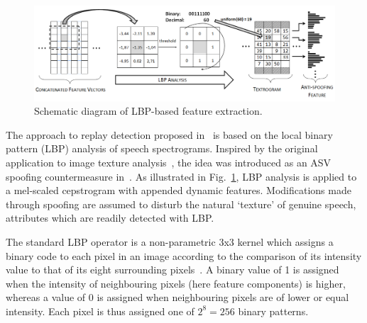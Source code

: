 \begin{figure}
	\includegraphics[width=1\linewidth]{Figs/LBP_idea.png}
	\caption{Schematic diagram of LBP-based feature extraction.}
	\label{fig:LBPfeature}
\end{figure}


The approach to replay detection proposed in~\cite{Alegre2014} is based on the local binary pattern (LBP) analysis of speech spectrograms.  
Inspired by the original application to image texture analysis~\cite{Ojala2002}, the idea was introduced as an ASV spoofing countermeasure in~\cite{Alegre2013a}.  
As illustrated in Fig.~\ref{fig:LBPfeature}, LBP analysis is applied to a mel-scaled cepstrogram with appended dynamic features.  Modifications made through spoofing are assumed to disturb the natural `texture' of genuine speech, attributes which are readily detected with LBP.   

The standard LBP operator is a non-parametric 3x3 kernel which assigns a binary code to each pixel in an image according to the comparison of its intensity value to that of its eight surrounding pixels~\cite{Ojala2002}. 
A binary value of 1 is assigned when the intensity of neighbouring pixels (here feature components) is higher, whereas a value of 0 is assigned when neighbouring pixels are of lower or equal intensity. Each pixel is thus assigned one of $2^8=256$ binary patterns.

